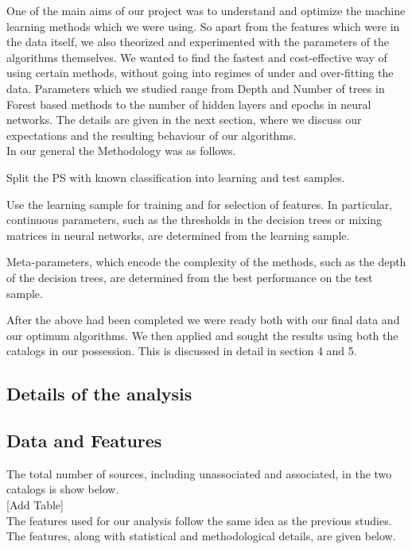 One of the main aims of our project was to understand and optimize the machine learning methods which we were using. So apart from the features which were in the data itself, we also theorized and experimented with the parameters of the algorithms themselves. We wanted to find the fastest and cost-effective way of using certain methods, without going into regimes of under and over-fitting the data. Parameters which we studied range from Depth and Number of trees in Forest based methods to the number of hidden layers and epochs in neural networks. The details are given in the next section, where we discuss our expectations and the resulting behaviour of our algorithms.\\
  
In our general the Methodology was as follows.
\ben
\item
Split the PS with known classification into learning and test samples.
\item
Use the learning sample for training and for selection of features.
In particular, continuous parameters, such as the thresholds in the decision trees or mixing matrices in neural networks, are determined from the learning sample. 
\item
Meta-parameters, which encode the complexity of the methods, such as the depth of the decision trees,
are determined from the best performance on the test sample.
\een

After the above had been completed we were ready both with our final data and our optimum algorithms. We then applied and sought the results using both the catalogs in our possession. This is discussed in detail in section 4 and 5.\\

\subsection{Details of the analysis}

\subsection{Data and Features}

The total number of sources, including unassociated and associated, in the two catalogs is show below. \\

[Add Table]\\

The features used for our analysis follow the same idea as the previous studies. The features, along with statistical and methodological details, are given below.\\

